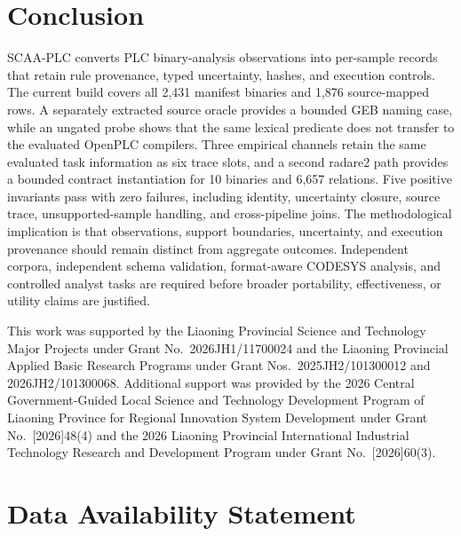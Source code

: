 \documentclass[manuscript,screen,review]{acmart}
\begin{document}
\section{Conclusion}

SCAA-PLC converts PLC binary-analysis observations into per-sample records that retain rule provenance, typed uncertainty, hashes, and execution controls. The current build covers all 2{,}431 manifest binaries and 1{,}876 source-mapped rows. A separately extracted source oracle provides a bounded GEB naming case, while an ungated probe shows that the same lexical predicate does not transfer to the evaluated OpenPLC compilers. Three empirical channels retain the same evaluated task information as six trace slots, and a second radare2 path provides a bounded contract instantiation for 10 binaries and 6{,}657 relations. Five positive invariants pass with zero failures, including identity, uncertainty closure, source trace, unsupported-sample handling, and cross-pipeline joins. The methodological implication is that observations, support boundaries, uncertainty, and execution provenance should remain distinct from aggregate outcomes. Independent corpora, independent schema validation, format-aware CODESYS analysis, and controlled analyst tasks are required before broader portability, effectiveness, or utility claims are justified.


\begin{acks}

This work was supported by the Liaoning Provincial Science and Technology Major Projects under Grant No.~2026JH1/11700024 and the Liaoning Provincial Applied Basic Research Programs under Grant Nos.~2025JH2/101300012 and 2026JH2/101300068. Additional support was provided by the 2026 Central Government-Guided Local Science and Technology Development Program of Liaoning Province for Regional Innovation System Development under Grant No.~[2026]48(4) and the 2026 Liaoning Provincial International Industrial Technology Research and Development Program under Grant No.~[2026]60(3).

\end{acks}

\section*{Data Availability Statement}
\end{document}
